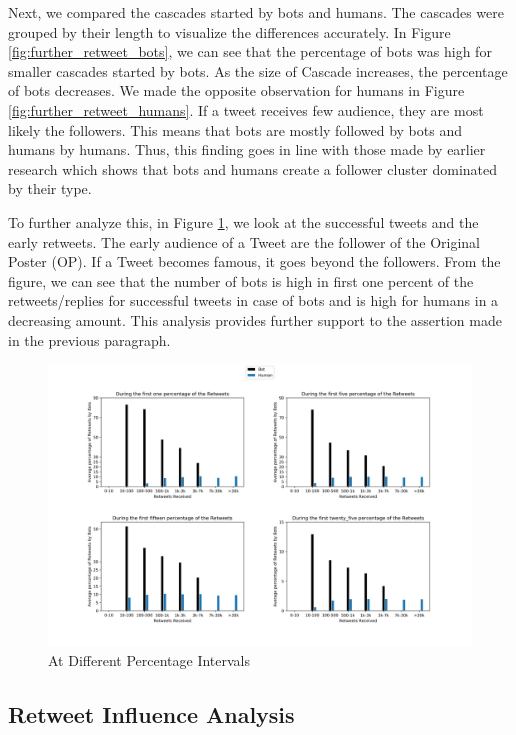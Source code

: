 \documentclass[letterpaper]{article}
\begin{document}
Next, we compared the cascades started by bots and humans. The cascades were grouped by their length to visualize the differences accurately. 
In Figure \ref{fig:further_retweet_bots}, we can see that the percentage of bots was high for smaller cascades started by bots. As the size of Cascade increases, the percentage of bots decreases. 
We made the opposite observation for humans in Figure \ref{fig:further_retweet_humans}. If a tweet receives few audience, they are most likely the followers. This means that bots are mostly
followed by bots and humans by humans. Thus, this finding goes in line with those made by earlier research which shows that bots and humans create a follower cluster dominated by their type.

To further analyze this, in Figure \ref{fig:humans_bots_percentage}, we look at the successful tweets and the early retweets. The early audience of a Tweet are the follower of the Original Poster (OP). If a Tweet becomes famous,
it goes beyond the followers. From the figure, we can see that the number of bots is high in first one percent of the retweets/replies for successful tweets in case of bots and is high for humans in a decreasing amount. This analysis provides further support to the assertion made in the previous paragraph.

\begin{figure}
    \includegraphics[width=\linewidth]{images/bot_humans_retweet_percentages.png}
    \caption{At Different Percentage Intervals}
    \label{fig:humans_bots_percentage}
\end{figure}



\subsection{Retweet Influence Analysis}
\end{document}
